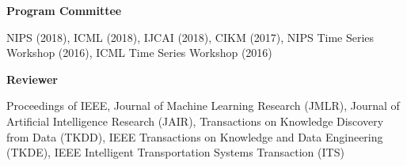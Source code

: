 \documentclass[margin,line]{res}
\newenvironment{list2}{
  \begin{list}{$\bullet$}{%
      \setlength{\itemsep}{0in}
      \setlength{\parsep}{0in} \setlength{\parskip}{0in}
      \setlength{\topsep}{0in} \setlength{\partopsep}{0in} 
      \setlength{\leftmargin}{0.2in}}}{\end{list}}
\begin{document}
\begin{resume}
{\bf Program Committee}

NIPS (2018), ICML (2018), IJCAI (2018), CIKM  (2017), NIPS Time Series Workshop (2016), ICML Time Series Workshop (2016) 


{\bf Reviewer}

Proceedings of IEEE, Journal of Machine Learning Research (JMLR), Journal of Artificial Intelligence Research (JAIR), Transactions on Knowledge Discovery from Data (TKDD), IEEE Transactions on Knowledge and Data Engineering (TKDE),  IEEE Intelligent Transportation Systems Transaction (ITS)




%


%
%
%
%



\end{resume}
\end{document}
